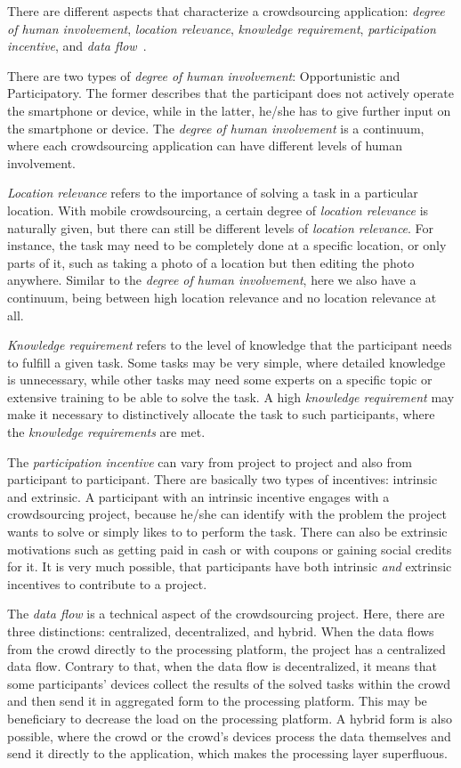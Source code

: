 There are different aspects that characterize a crowdsourcing application: \textit{degree of human involvement}, \textit{location relevance}, \textit{knowledge requirement}, \textit{participation incentive}, and \textit{data flow}~\cite{ray2023survey,kong2019mobile}.

There are two types of \textit{degree of human involvement}: Opportunistic and Participatory.
The former describes that the participant does not actively operate the smartphone or device, while in the latter, he/she has to give further input on the smartphone or device.
The \textit{degree of human involvement} is a continuum, where each crowdsourcing application can have different levels of human involvement.

\textit{Location relevance} refers to the importance of solving a task in a particular location.
With mobile crowdsourcing, a certain degree of \textit{location relevance} is naturally given, but there can still be different levels of \textit{location relevance}.
For instance, the task may need to be completely done at a specific location, or only parts of it, such as taking a photo of a location but then editing the photo anywhere.
Similar to the \textit{degree of human involvement}, here we also have a continuum, being between high location relevance and no location relevance at all.

\textit{Knowledge requirement} refers to the level of knowledge that the participant needs to fulfill a given task.
Some tasks may be very simple, where detailed knowledge is unnecessary, while other tasks may need some experts on a specific topic or extensive training to be able to solve the task.
A high \textit{knowledge requirement} may make it necessary to distinctively allocate the task to such participants, where the \textit{knowledge requirements} are met.

The \textit{participation incentive} can vary from project to project and also from participant to participant.
There are basically two types of incentives: intrinsic and extrinsic.
A participant with an intrinsic incentive engages with a crowdsourcing project, because he/she can identify with the problem the project wants to solve or simply likes to to perform the task.
There can also be extrinsic motivations such as getting paid in cash or with coupons or gaining social credits for it.
It is very much possible, that participants have both intrinsic \textit{and} extrinsic incentives to contribute to a project.

The \textit{data flow} is a technical aspect of the crowdsourcing project.
Here, there are three distinctions: centralized, decentralized, and hybrid.
When the data flows from the crowd directly to the processing platform, the project has a centralized data flow.
Contrary to that, when the data flow is decentralized, it means that some participants' devices collect the results of the solved tasks within the crowd and then send it in aggregated form to the processing platform.
This may be beneficiary to decrease the load on the processing platform.
A hybrid form is also possible, where the crowd or the crowd's devices process the data themselves and send it directly to the application, which makes the processing layer superfluous. 

